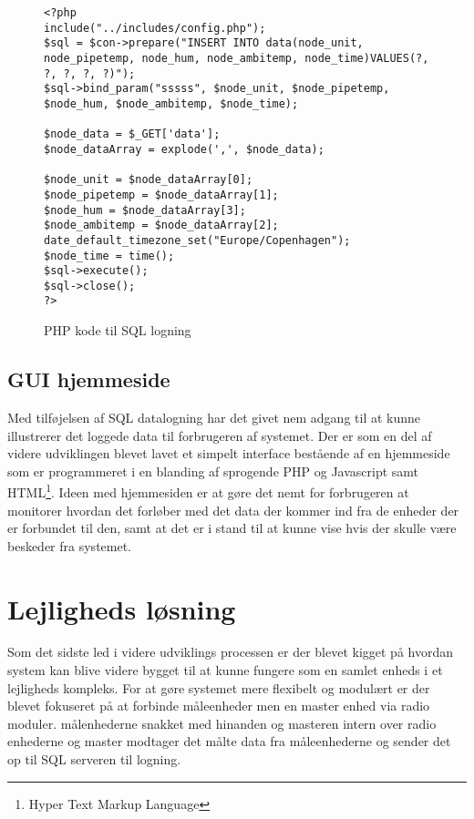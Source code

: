 \begin{figure}[!ht]
	\begin{lstlisting}
<?php
include("../includes/config.php");
$sql = $con->prepare("INSERT INTO data(node_unit, node_pipetemp, node_hum, node_ambitemp, node_time)VALUES(?, ?, ?, ?, ?)");
$sql->bind_param("sssss", $node_unit, $node_pipetemp, $node_hum, $node_ambitemp, $node_time);

$node_data = $_GET['data'];
$node_dataArray = explode(',', $node_data);

$node_unit = $node_dataArray[0];
$node_pipetemp = $node_dataArray[1];
$node_hum = $node_dataArray[3];
$node_ambitemp = $node_dataArray[2];
date_default_timezone_set("Europe/Copenhagen"); 
$node_time = time(); 
$sql->execute();
$sql->close();
?>
\end{lstlisting}
\caption{PHP kode til SQL logning}
\label{phpsql}
\end{figure}

\subsection{GUI hjemmeside}
Med tilføjelsen af SQL datalogning har det givet nem adgang til at kunne illustrerer det loggede data til forbrugeren af systemet.
Der er som en del af videre udviklingen blevet lavet et simpelt interface bestående af en hjemmeside som er programmeret i en blanding af sprogende PHP og Javascript samt HTML\footnote{Hyper Text Markup Language}.
\newline
Ideen med hjemmesiden er at gøre det nemt for forbrugeren at monitorer hvordan det forløber med det data der kommer ind fra de enheder der er forbundet til den, samt at det er i stand til at kunne vise hvis der skulle være beskeder fra systemet.

\section{Lejligheds løsning}
Som det sidste led i videre udviklings processen er der blevet kigget på hvordan system kan blive videre bygget til at kunne fungere som en samlet enheds i et lejligheds kompleks. For at gøre systemet mere flexibelt og modulært er der blevet fokuseret på at forbinde måleenheder men en master enhed via radio moduler. målenhederne snakket med hinanden og masteren intern over radio enhederne og master modtager det målte data fra måleenhederne og sender det op til SQL serveren til logning.

